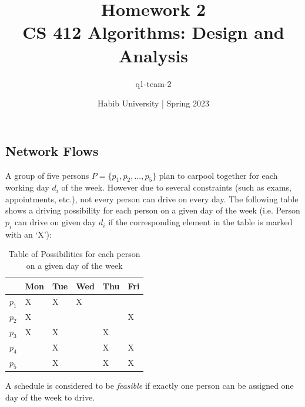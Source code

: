 \documentclass[addpoints,a4paper]{exam}
\title{Homework 2\\ CS 412 Algorithms: Design and Analysis}
\author{q1-team-2}  %
\date{Habib University | Spring 2023}
\begin{document}
\maketitle

\begin{questions}


	\section*{Network Flows}
	\question A group of five persons $P = \{p_1, p_2, ..., p_5\}$ plan to carpool together for each working day $d_i$ of the week. However due to several constraints (such as exams, appointments, etc.), not every person can drive on every day. The following table shows a driving possibility for each person on a given day of the week (i.e. Person $p_i$ can drive on given day $d_i$ if the corresponding element in the table is marked with an `X'):
	
	\begin{table}[h]
		\centering
		\renewcommand{\arraystretch}{1.5}
		\begin{tabular}{llllll}
			      & Mon & Tue & Wed & Thu & Fri \\ \hline
			$p_1$ & X   & X   & X   &     &     \\ \hline
			$p_2$ & X   &     &     &     & X   \\ \hline
			$p_3$ & X   & X   &     & X   &     \\ \hline
			$p_4$ &     & X   &     & X   & X   \\ \hline
			$p_5$ &     & X   &     & X   & X   \\ \hline
		\end{tabular}%
		\caption{Table of Possibilities for each person on a given day of the week} \label{key}
	\end{table}
	
	A schedule is considered to be \textit{feasible} if exactly one person can be assigned one day of the week to drive.
\end{questions}
\end{document}
